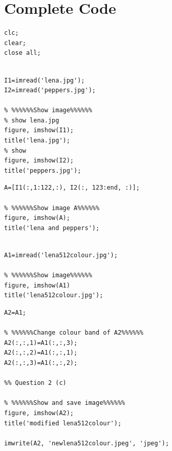 \documentclass{article}
\begin{document}
\section{Complete Code}

\begin{Verbatim}[frame=lines, label=Initialization]
clc;
clear;
close all;
\end{Verbatim}

\begin{Verbatim}[frame=lines, label=Question 1 (a)]
% %%%%%%Read image%%%%%%

I1=imread('lena.jpg');
I2=imread('peppers.jpg');

% %%%%%%Show image%%%%%%
% show lena.jpg
figure, imshow(I1);
title('lena.jpg');
% show
figure, imshow(I2);
title('peppers.jpg');
\end{Verbatim}

\begin{Verbatim}[frame=lines, label=Question 1 (b)]
% %%%%%%Construct image A%%%%%%
A=[I1(:,1:122,:), I2(:, 123:end, :)];

% %%%%%%Show image A%%%%%%
figure, imshow(A);
title('lena and peppers');
\end{Verbatim}

\begin{Verbatim}[frame=lines, label=Question 2 (a)]
% %%%%%%Read image%%%%%%

A1=imread('lena512colour.jpg');

% %%%%%%Show image%%%%%%
figure, imshow(A1)
title('lena512colour.jpg');
\end{Verbatim}

\begin{Verbatim}[frame=lines, label={Question 2 (b, c)}]
% %%%%%%Duplicate image%%%%%%
A2=A1;

% %%%%%%Change colour band of A2%%%%%%
A2(:,:,1)=A1(:,:,3);
A2(:,:,2)=A1(:,:,1);
A2(:,:,3)=A1(:,:,2);

%% Question 2 (c)

% %%%%%%Show and save image%%%%%%
figure, imshow(A2);
title('modified lena512colour');

imwrite(A2, 'newlena512colour.jpeg', 'jpeg');
\end{Verbatim}
\end{document}
